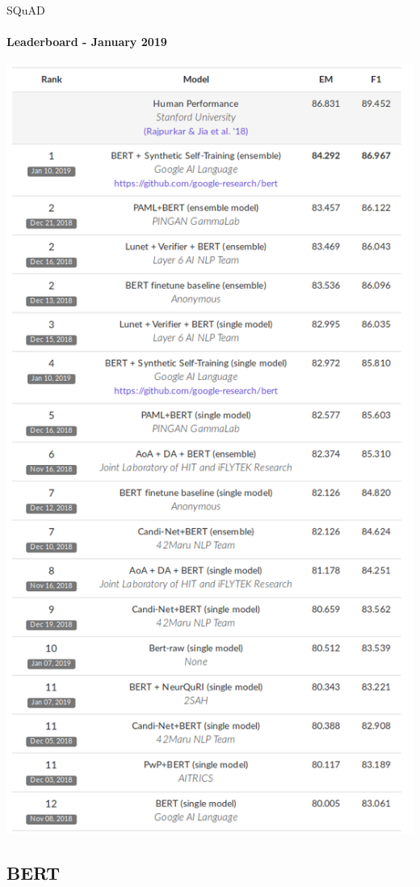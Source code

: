 \documentclass{beamer}
\begin{document}
\begin{frame}{SQuAD}
{
\framesubtitle{Leaderboard - January 2019}
\includegraphics[width=\textwidth]{ml_imgs/squad_jan.png}
}
    
\end{frame}


\subsection{BERT}
\end{document}
